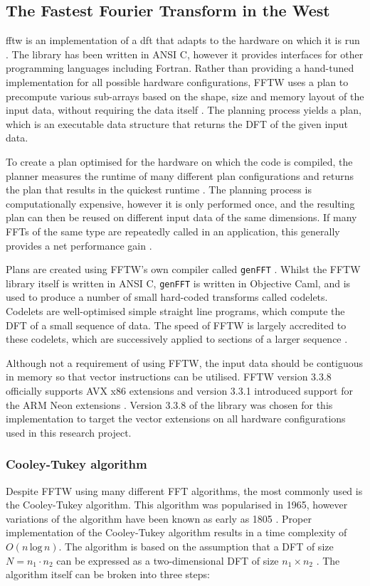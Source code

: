 \documentclass[a4paper,11pt]{report}
\begin{document}
\subsection{The Fastest Fourier Transform in the West}
\gls{fftw} is an implementation of a \gls{dft} that adapts to the hardware on which it is run \cite{frigo2005design}. The library has been written in ANSI C, however it provides interfaces for other programming languages including Fortran. Rather than providing a hand-tuned implementation for all possible hardware configurations, FFTW uses a plan to precompute various sub-arrays based on the shape, size and memory layout of the input data, without requiring the data itself \cite{frigo2005design}. The planning process yields a plan, which is an executable data structure that returns the DFT of the given input data. 
\par
To create a plan optimised for the hardware on which the code is compiled, the planner measures the runtime of many different plan configurations and returns the plan that results in the quickest runtime \cite{frigo2005design}. The planning process is computationally expensive, however it is only performed once, and the resulting plan can then be reused on different input data of the same dimensions. If many FFTs of the same type are repeatedly called in an application, this generally provides a net performance gain \cite{frigo2003fftw}.
\par
Plans are created using FFTW's own compiler called \texttt{genFFT}  \cite{frigo2005design}. Whilst the FFTW library itself is written in ANSI C, \texttt{genFFT} is written in Objective Caml, and is used to produce a number of small hard-coded transforms called codelets. Codelets are well-optimised simple straight line programs, which compute the DFT of a small sequence of data. The speed of FFTW is largely accredited to these codelets, which are successively applied to sections of a larger sequence \cite{frigo2005design}. 
\par
Although not a requirement of using FFTW, the input data should be contiguous in memory so that vector instructions can be utilised. FFTW version 3.3.8 officially supports AVX x86 extensions and version 3.3.1 introduced support for the ARM Neon extensions \cite{frigo2003fftw}. Version 3.3.8 of the library was chosen for this implementation to target the vector extensions on all hardware configurations used in this research project. 


\subsubsection{Cooley-Tukey algorithm}
Despite FFTW using many different FFT algorithms, the most commonly used is the Cooley-Tukey algorithm. This algorithm was popularised in 1965, however variations of the algorithm have been known as early as 1805 \cite{cooley1965algorithm, heideman1985gauss}. Proper implementation of the Cooley-Tukey algorithm results in a time complexity of $O(n\, \textrm{log}\, n)$. The algorithm is based on the assumption that a DFT of size $N = n_{1} \cdot n_{2}$ can be expressed as a two-dimensional DFT of size $n_{1} \times n_{2}$ \cite{frigo2005design}. The algorithm itself can be broken into three steps: 
\end{document}
